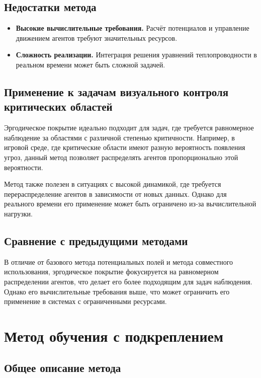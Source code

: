 \subsection{Недостатки метода}

\begin{itemize}
	\item \textbf{Высокие вычислительные требования.} Расчёт потенциалов и управление движением агентов требуют значительных ресурсов.
	\item \textbf{Сложность реализации.} Интеграция решения уравнений теплопроводности в реальном времени может быть сложной задачей.
\end{itemize}

\subsection{Применение к задачам визуального контроля критических областей}

Эргодическое покрытие идеально подходит для задач, где требуется равномерное наблюдение за областями с различной степенью критичности. Например, в игровой среде, где критические области имеют разную вероятность появления угроз, данный метод позволяет распределять агентов пропорционально этой вероятности. 

Метод также полезен в ситуациях с высокой динамикой, где требуется перераспределение агентов в зависимости от новых данных. Однако для реального времени его применение может быть ограничено из-за вычислительной нагрузки.

\subsection{Сравнение с предыдущими методами}

В отличие от базового метода потенциальных полей и метода совместного использования, эргодическое покрытие фокусируется на равномерном распределении агентов, что делает его более подходящим для задач наблюдения. Однако его вычислительные требования выше, что может ограничить его применение в системах с ограниченными ресурсами.

\section{Метод обучения с подкреплением}

\subsection{Общее описание метода}

